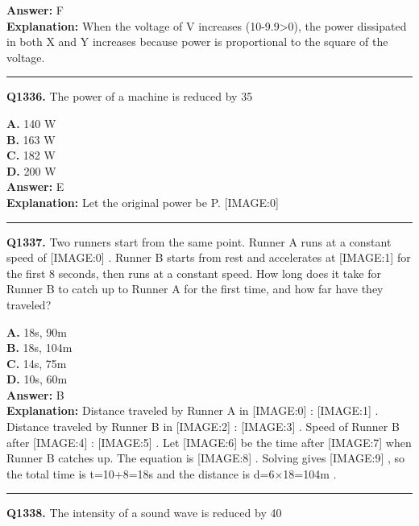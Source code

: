 \documentclass[12pt]{article}
\begin{document}
\textbf{Answer:} F \\
\textbf{Explanation:} When the voltage of V increases (10-9.9>0), the power dissipated in both X and Y increases because power is proportional to the square of the voltage.

\hrule
\vspace{1em}


\noindent
\textbf{Q1336.} The power of a machine is reduced by 35%



\textbf{A.} 140 W \\
\textbf{B.} 163 W \\
\textbf{C.} 182 W \\
\textbf{D.} 200 W \\

\textbf{Answer:} E \\
\textbf{Explanation:} Let the original power be P.
[IMAGE:0]

\hrule
\vspace{1em}


\noindent
\textbf{Q1337.} Two runners start from the same point. Runner A runs at a constant speed of
[IMAGE:0]
. Runner B starts from rest and accelerates at
[IMAGE:1]
for the first 8
seconds, then runs at a constant speed. How long does it take for Runner B to catch up to Runner A for the first time, and how far have they traveled?



\textbf{A.} 18s, 90m \\
\textbf{B.} 18s, 104m \\
\textbf{C.} 14s, 75m \\
\textbf{D.} 10s, 60m \\

\textbf{Answer:} B \\
\textbf{Explanation:} Distance traveled by Runner A in
[IMAGE:0]
:
[IMAGE:1]
. Distance traveled by Runner B in
[IMAGE:2]
:
[IMAGE:3]
.
Speed of Runner B after
[IMAGE:4]
:
[IMAGE:5]
.
Let
[IMAGE:6]
be the time after
[IMAGE:7]
when Runner B catches up. The equation is
[IMAGE:8]
. Solving gives
[IMAGE:9]
, so the total time is t=10+8=18s
and the distance is d=6×18=104m
.

\hrule
\vspace{1em}


\noindent
\textbf{Q1338.} The intensity of a sound wave is reduced by 40%
\end{document}
